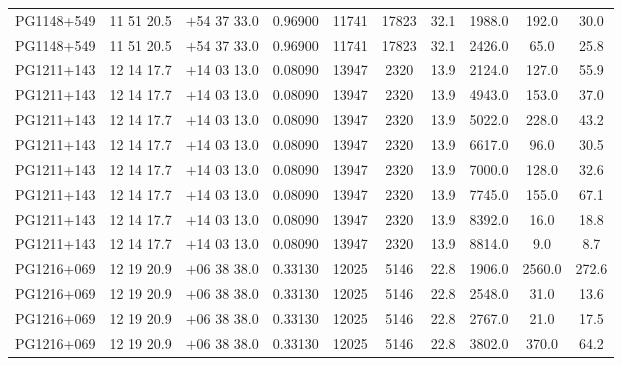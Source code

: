 \begin{landscape}
\begin{center}
\begin{longtable}{l c c c c c c c c c}
PG1148+549  &              11 51 20.5  &         $+$54 37 33.0  &       0.96900  & 11741  &   17823  &      32.1  &      1988.0  &  192.0  &  30.0  \\
PG1148+549  &              11 51 20.5  &         $+$54 37 33.0  &       0.96900  & 11741  &   17823  &      32.1  &      2426.0  &  65.0  &   25.8  \\
PG1211+143  &              12 14 17.7  &         $+$14 03 13.0  &       0.08090  & 13947  &   2320  &       13.9  &      2124.0  &  127.0  &  55.9  \\
PG1211+143  &              12 14 17.7  &         $+$14 03 13.0  &       0.08090  & 13947  &   2320  &       13.9  &      4943.0  &  153.0  &  37.0  \\
PG1211+143  &              12 14 17.7  &         $+$14 03 13.0  &       0.08090  & 13947  &   2320  &       13.9  &      5022.0  &  228.0  &  43.2  \\
PG1211+143  &              12 14 17.7  &         $+$14 03 13.0  &       0.08090  & 13947  &   2320  &       13.9  &      6617.0  &  96.0  &   30.5  \\
PG1211+143  &              12 14 17.7  &         $+$14 03 13.0  &       0.08090  & 13947  &   2320  &       13.9  &      7000.0  &  128.0  &  32.6  \\
PG1211+143  &              12 14 17.7  &         $+$14 03 13.0  &       0.08090  & 13947  &   2320  &       13.9  &      7745.0  &  155.0  &  67.1  \\
PG1211+143  &              12 14 17.7  &         $+$14 03 13.0  &       0.08090  & 13947  &   2320  &       13.9  &      8392.0  &  16.0  &   18.8  \\
PG1211+143  &              12 14 17.7  &         $+$14 03 13.0  &       0.08090  & 13947  &   2320  &       13.9  &      8814.0  &  9.0  &    8.7  \\
PG1216+069  &              12 19 20.9  &         $+$06 38 38.0  &       0.33130  & 12025  &   5146  &       22.8  &      1906.0  &  2560.0  & 272.6  \\
PG1216+069  &              12 19 20.9  &         $+$06 38 38.0  &       0.33130  & 12025  &   5146  &       22.8  &      2548.0  &  31.0  &   13.6  \\
PG1216+069  &              12 19 20.9  &         $+$06 38 38.0  &       0.33130  & 12025  &   5146  &       22.8  &      2767.0  &  21.0  &   17.5  \\
PG1216+069  &              12 19 20.9  &         $+$06 38 38.0  &       0.33130  & 12025  &   5146  &       22.8  &      3802.0  &  370.0  &  64.2  \\

\end{longtable}
\end{center}
\end{landscape}

